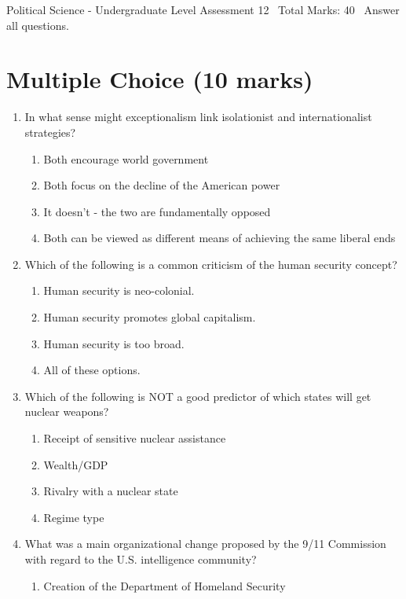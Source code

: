 \documentclass[12pt]{article}
\begin{document}
\begin{center}
Political Science - Undergraduate Level Assessment 12 \
Total Marks: 40 \
Answer all questions.
\end{center}

\section*{Multiple Choice (10 marks)}
\begin{enumerate}[label=\arabic*.]
\item In what sense might exceptionalism link isolationist and internationalist strategies?
\begin{enumerate}[label=(\alph*)]
    \item Both encourage world government
    \item Both focus on the decline of the American power
    \item It doesn't - the two are fundamentally opposed
    \item Both can be viewed as different means of achieving the same liberal ends
\end{enumerate}
\item Which of the following is a common criticism of the human security concept?
\begin{enumerate}[label=(\alph*)]
    \item Human security is neo-colonial.
    \item Human security promotes global capitalism.
    \item Human security is too broad.
    \item All of these options.
\end{enumerate}
\item Which of the following is NOT a good predictor of which states will get nuclear weapons?
\begin{enumerate}[label=(\alph*)]
    \item Receipt of sensitive nuclear assistance
    \item Wealth/GDP
    \item Rivalry with a nuclear state
    \item Regime type
\end{enumerate}
\item What was a main organizational change proposed by the 9/11 Commission with regard to the U.S. intelligence community?
\begin{enumerate}[label=(\alph*)]
    \item Creation of the Department of Homeland Security

\end{enumerate}
\end{enumerate}
\end{document}

